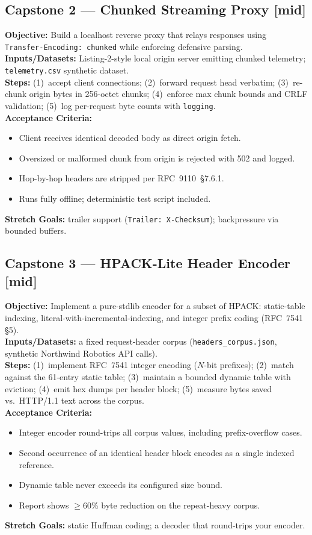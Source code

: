 \subsection{Capstone 2 --- Chunked Streaming Proxy [mid]}
\textbf{Objective:} Build a localhost reverse proxy that relays responses using \texttt{Transfer-Encoding: chunked} while enforcing defensive parsing.\\
\textbf{Inputs/Datasets:} Listing-2-style local origin server emitting chunked telemetry; \texttt{telemetry.csv} synthetic dataset.\\
\textbf{Steps:} (1)~accept client connections; (2)~forward request head verbatim; (3)~re-chunk origin bytes in 256-octet chunks; (4)~enforce max chunk bounds and CRLF validation; (5)~log per-request byte counts with \texttt{logging}.\\
\textbf{Acceptance Criteria:}
\begin{itemize}
  \item[$\square$] Client receives identical decoded body as direct origin fetch.
  \item[$\square$] Oversized or malformed chunk from origin is rejected with 502 and logged.
  \item[$\square$] Hop-by-hop headers are stripped per RFC~9110~\S7.6.1.
  \item[$\square$] Runs fully offline; deterministic test script included.
\end{itemize}
\textbf{Stretch Goals:} trailer support (\texttt{Trailer: X-Checksum}); backpressure via bounded buffers.

\subsection{Capstone 3 --- HPACK-Lite Header Encoder [mid]}
\textbf{Objective:} Implement a pure-stdlib encoder for a subset of HPACK: static-table indexing, literal-with-incremental-indexing, and integer prefix coding (RFC~7541 \S5).\\
\textbf{Inputs/Datasets:} a fixed request-header corpus (\texttt{headers\_corpus.json}, synthetic Northwind Robotics API calls).\\
\textbf{Steps:} (1)~implement RFC~7541 integer encoding ($N$-bit prefixes); (2)~match against the 61-entry static table; (3)~maintain a bounded dynamic table with eviction; (4)~emit hex dumps per header block; (5)~measure bytes saved vs.\ HTTP/1.1 text across the corpus.\\
\textbf{Acceptance Criteria:}
\begin{itemize}
  \item[$\square$] Integer encoder round-trips all corpus values, including prefix-overflow cases.
  \item[$\square$] Second occurrence of an identical header block encodes as a single indexed reference.
  \item[$\square$] Dynamic table never exceeds its configured size bound.
  \item[$\square$] Report shows $\geq$60\% byte reduction on the repeat-heavy corpus.
\end{itemize}
\textbf{Stretch Goals:} static Huffman coding; a decoder that round-trips your encoder.

